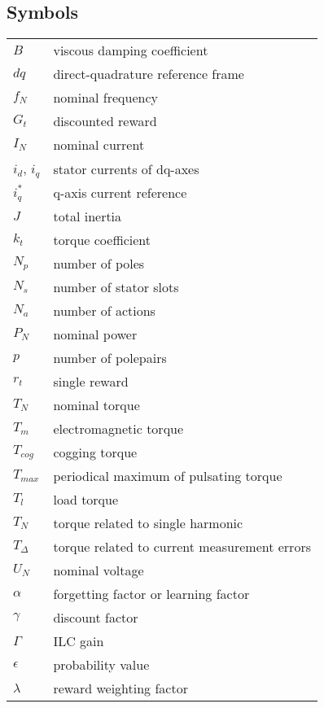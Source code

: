 \documentclass[english, 12pt, a4paper, elec, utf8, a-2b, online]{aaltothesis}
\begin{document}

\subsection*{Symbols}

\begin{tabular}{ll}
$B$           & viscous damping coefficient \\
$dq$          & direct-quadrature reference frame \\
$f_N$         & nominal frequency \\
$G_t$         & discounted reward \\
$I_N$         & nominal current \\
$i_{d}$, $i_{q}$ & stator currents of dq-axes \\
$i^*_{q}$     & q-axis current reference \\
$J$           & total inertia \\
$k_t$         & torque coefficient \\
$N_p$         & number of poles \\
$N_s$         & number of stator slots \\
$N_a$         & number of actions \\
$P_N$         & nominal power \\
$p$           & number of polepairs \\
$r_t$         & single reward \\
$T_N$         & nominal torque \\
$T_m$         & electromagnetic torque \\
$T_{cog}$     & cogging torque \\
$T_{max}$     & periodical maximum of pulsating torque \\
$T_l$         & load torque \\
$T_N$         & torque related to single harmonic \\
$T_\Delta$    & torque related to current measurement errors \\
$U_N$         & nominal voltage \\
$\alpha$      & forgetting factor or learning factor \\
$\gamma$      & discount factor \\
$\Gamma$      & ILC gain \\
$\epsilon$    & probability value \\
$\lambda$     & reward weighting factor \\

\end{tabular}
\end{document}

